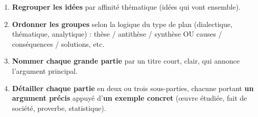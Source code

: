 \documentclass[11pt]{article}
\begin{document}
\begin{methode}
\begin{enumerate}
\item \textbf{Regrouper les idées} par affinité thématique (idées qui vont ensemble).
\item \textbf{Ordonner les groupes} selon la logique du type de plan (dialectique, thématique, analytique) : thèse / antithèse / synthèse OU causes / conséquences / solutions, etc.
\item \textbf{Nommer chaque grande partie} par un titre court, clair, qui annonce l'argument principal.
\item \textbf{Détailler chaque partie} en deux ou trois sous-parties, chacune portant \textbf{un argument précis} appuyé d'\textbf{un exemple concret} (œuvre étudiée, fait de société, proverbe, statistique).
\end{enumerate}
\end{methode}
\end{document}
